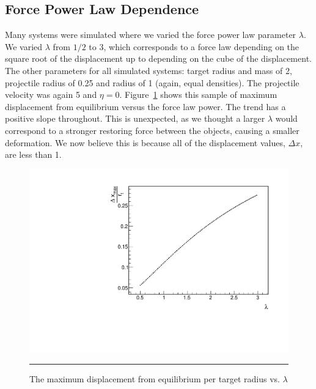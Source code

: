 \documentclass[aps,prl,floatfix,preprint,nofootinbib]{revtex4}
\begin{document}
\subsection{Force Power Law Dependence}
Many systems were simulated where we varied the force power law parameter $\lambda$. We varied $\lambda$ from $1/2$ to $3$, which corresponds to a force law depending on the square root of the displacement up to depending on the cube of the displacement. The other parameters for all simulated systems: target radius and mass of 2, projectile radius of 0.25 and radius of 1 (again, equal densities). The projectile velocity was again 5 and $\eta = 0$. Figure~\ref{fig:changing_lambda} shows this sample of maximum displacement from equilibrium versus the force law power. The trend has a positive slope throughout. This is unexpected, as we thought a larger $\lambda$ would correspond to a stronger restoring force between the objects, causing a smaller deformation. We now believe this is because all of the displacement values, $\Delta x$, are less than 1.
\begin{figure}[h!]
  \includegraphics[width=.45\linewidth]{plots/trend_plots/dxmax_vs_lambda.pdf}
                  {\par\nobreak\rule[9pt]{35em}{0.5pt}\vspace{-5mm}}
                  \caption{The maximum displacement from equilibrium per target radius vs. $\lambda$}
                  \label{fig:changing_lambda}
\end{figure}
\end{document}
